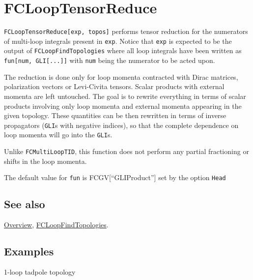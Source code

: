 \documentclass[../FeynCalcManual.tex]{subfiles}
\begin{document}
\begin{Shaded}
\begin{Highlighting}[]
 
\end{Highlighting}
\end{Shaded}

\hypertarget{fclooptensorreduce}{
\section{FCLoopTensorReduce}\label{fclooptensorreduce}}

\texttt{FCLoopTensorReduce[\allowbreak{}exp,\ \allowbreak{}topos]}
performs tensor reduction for the numerators of multi-loop integrals
present in \texttt{exp}. Notice that \texttt{exp} is expected to be the
output of \texttt{FCLoopFindTopologies} where all loop integrals have
been written as
\texttt{fun[\allowbreak{}num,\ \allowbreak{}GLI[\allowbreak{}...]]} with
\texttt{num} being the numerator to be acted upon.

The reduction is done only for loop momenta contracted with Dirac
matrices, polarization vectors or Levi-Civita tensors. Scalar products
with external momenta are left untouched. The goal is to rewrite
everything in terms of scalar products involving only loop momenta and
external momenta appearing in the given topology. These quantities can
be then rewritten in terms of inverse propagators (\texttt{GLI}s with
negative indices), so that the complete dependence on loop momenta will
go into the \texttt{GLI}s.

Unlike \texttt{FCMultiLoopTID}, this function does not perform any
partial fractioning or shifts in the loop momenta.

The default value for \texttt{fun} is FCGV{[}``GLIProduct''{]} set by
the option \texttt{Head}

\subsection{See also}

\hyperlink{toc}{Overview},
\hyperlink{fcloopfindtopologies}{FCLoopFindTopologies}.

\subsection{Examples}

1-loop tadpole topology

\begin{Shaded}
\begin{Highlighting}[]
\ExtensionTok{=}\OperatorTok{[}\OperatorTok{,} \OperatorTok{\{}\OperatorTok{[\{}\OperatorTok{,} \SpecialCharTok{\^{}}\OperatorTok{\}]\},} \OperatorTok{\{}\OperatorTok{\},} \OperatorTok{\{\},} \OperatorTok{\{\},} \OperatorTok{\{\}]}
\end{Highlighting}
\end{Shaded}
\end{document}
